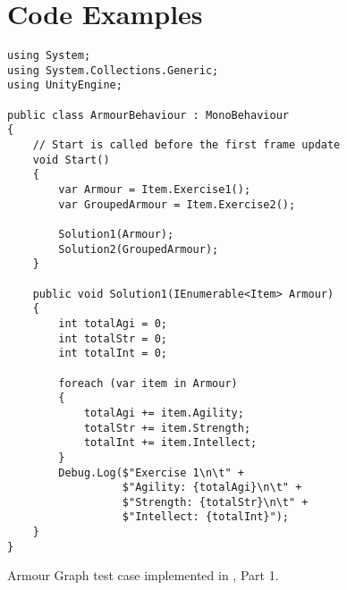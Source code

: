 \chapter{Code Examples} \label{app:terse-diff-comp}
\begin{listing}[H]
\begin{verbatim}
using System;
using System.Collections.Generic;
using UnityEngine;

public class ArmourBehaviour : MonoBehaviour
{
    // Start is called before the first frame update
    void Start()
    {
        var Armour = Item.Exercise1();
        var GroupedArmour = Item.Exercise2();

        Solution1(Armour);
        Solution2(GroupedArmour);
    }

    public void Solution1(IEnumerable<Item> Armour)
    {
        int totalAgi = 0;
        int totalStr = 0;
        int totalInt = 0;

        foreach (var item in Armour)
        {
            totalAgi += item.Agility;
            totalStr += item.Strength;
            totalInt += item.Intellect;
        }
        Debug.Log($"Exercise 1\n\t" +
                  $"Agility: {totalAgi}\n\t" +
                  $"Strength: {totalStr}\n\t" +
                  $"Intellect: {totalInt}");
    }
}

\end{verbatim}
\caption{Armour Graph test case implemented in \cs, Part 1.}
\label{lst:armour-graph-cs-1}
\end{listing}

